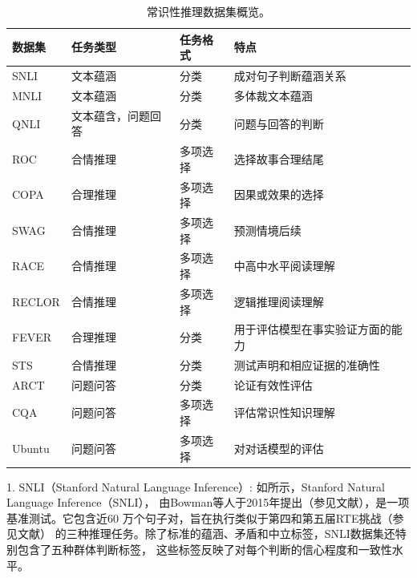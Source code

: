 \begin{table}[th!]
  \centering
  \scriptsize
  \begin{tabular}{
  >{\centering\arraybackslash}p{}|
  >{\centering\arraybackslash}p{}|
  >{\centering\arraybackslash}p{}|
  p{}}
      \toprule
      \textbf{数据集} & \textbf{任务类型} & \textbf{任务格式} & \textbf{特点} \\ 
      \midrule
      SNLI & 文本蕴涵 & 分类 & 成对句子判断蕴涵关系 \\ 
      \midrule
      MNLI & 文本蕴涵 & 分类 & 多体裁文本蕴涵 \\ 
      \midrule
      QNLI & 文本蕴含，问题回答 & 分类 & 问题与回答的判断 \\ 
      \midrule
      ROC & 合情推理 & 多项选择 & 选择故事合理结尾 \\ 
      \midrule
      COPA & 合理推理 & 多项选择 & 因果或效果的选择 \\ 
      \midrule
      SWAG & 合情推理 & 多项选择 & 预测情境后续 \\ 
      \midrule
      RACE & 合情推理 & 多项选择 & 中高中水平阅读理解 \\ 
      \midrule
      RECLOR & 合情推理 & 多项选择 & 逻辑推理阅读理解 \\ 
      \midrule
      FEVER & 合理推理 & 分类 &用于评估模型在事实验证方面的能力 \\ 
      \midrule
      STS & 合情推理 & 分类 &  测试声明和相应证据的准确性\\ 
      \midrule
      ARCT & 问题问答 & 分类 & 论证有效性评估 \\ 
      \midrule
      CQA & 问题问答 & 多项选择 & 评估常识性知识理解 \\ 
      \midrule
      Ubuntu & 问题问答 & 多项选择 & 对对话模型的评估 \\
      \bottomrule
  \end{tabular}
  \caption{常识性推理数据集概览。}
  \label{tab1:datasets}
\end{table}




1. SNLI（Stanford Natural Language Inference）:
如所示，Stanford Natural Language Inference（SNLI），
由Bowman等人于2015年提出（参见文献\cite{bowman2015large}），是一项基准测试。它包含近60
万个句子对，旨在执行类似于第四和第五届RTE挑战（参见文献\cite{giampiccolo2008fourth,bentivogli2009fifth}）
的三种推理任务。除了标准的蕴涵、矛盾和中立标签，SNLI数据集还特别包含了五种群体判断标签，
这些标签反映了对每个判断的信心程度和一致性水平。

